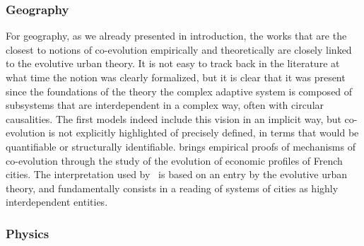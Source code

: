 \documentclass[letterpaper]{article}
\begin{document}
\subsubsection{Geography}

For geography, as we already presented in introduction, the works that are the closest to notions of co-evolution empirically and theoretically are closely linked to the evolutive urban theory. It is not easy to track back in the literature at what time the notion was clearly formalized, but it is clear that it was present since the foundations of the theory \citep{pumain1997pour} the complex adaptive system is composed of subsystems that are interdependent in a complex way, often with circular causalities. The first models indeed include this vision in an implicit way, but co-evolution is not explicitly highlighted of precisely defined, in terms that would be quantifiable or structurally identifiable. \cite{paulus2004coevolution} brings empirical proofs of mechanisms of co-evolution through the study of the evolution of economic profiles of French cities. The interpretation used by~\cite{schmitt2014modelisation} is based on an entry by the evolutive urban theory, and fundamentally consists in a reading of systems of cities as highly interdependent entities.




\subsubsection{Physics}
\end{document}
